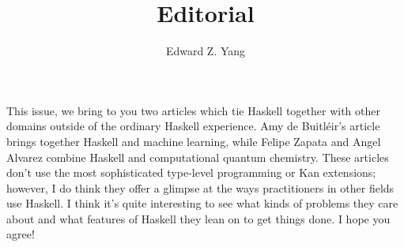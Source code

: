 \documentclass{tmr}
\title{Editorial}
\author{Edward Z. Yang\email{ezyang@cs.stanford.edu}}
\begin{document}
This issue, we bring to you two articles which tie Haskell together with
other domains outside of the ordinary Haskell experience.  Amy de
Buitl\'eir's article brings together Haskell and machine learning, while
Felipe Zapata and Angel Alvarez combine Haskell and computational
quantum chemistry.  These articles don't use the most sophisticated
type-level programming or Kan extensions; however, I do think they offer
a glimpse at the ways practitioners in other fields use Haskell.  I think
it's quite interesting to see what kinds of problems they care about
and what features of Haskell they lean on to get things done.  I hope you
agree!
\end{document}

